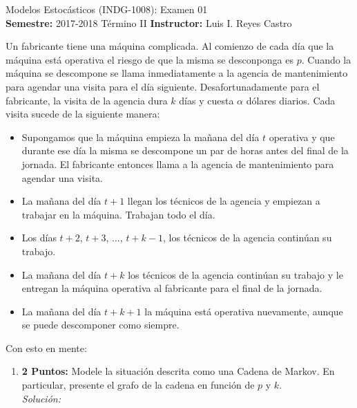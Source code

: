 \documentclass[ a4paper, twoside, 11pt]{article}
\newcommand{\numero}{01}
\begin{document}
\allowdisplaybreaks



\begin{center}
\Large Modelos Estoc\'asticos (INDG-1008): Examen \numero \\[2ex]
\small \textbf{Semestre:} 2017-2018 T\'ermino II \qquad
\textbf{Instructor:} Luis I. Reyes Castro
\end{center}
\fullskip

\begin{problem}
\label{prob:maquina-caprichosa}
Un fabricante tiene una m\'aquina complicada. Al comienzo de cada d\'ia que la m\'aquina est\'a operativa el riesgo de que la misma se desconponga es $p$. Cuando la m\'aquina se descompone se llama inmediatamente a la agencia de mantenimiento para agendar una visita para el d\'ia siguiente. Desafortunadamente para el fabricante, la visita de la agencia dura \linebreak $k$ d\'ias y cuesta $\alpha$ d\'olares diarios. Cada visita sucede de la siguiente manera: 
\begin{itemize}
\item Supongamos que la m\'aquina empieza la ma\~nana del d\'ia $t$ operativa y que durante ese d\'ia la misma se descompone un par de horas antes del final de la jornada. El fabricante entonces llama a la agencia de mantenimiento para agendar una visita. 
\item La ma\~nana del d\'ia $t+1$ llegan los t\'ecnicos de la agencia y empiezan a trabajar en la m\'aquina. Trabajan todo el d\'ia. 
\item Los d\'ias $t+2$, $t+3$, $\dots$, $t+k-1$, los t\'ecnicos de la agencia contin\'uan su trabajo. 
\item La ma\~nana del d\'ia $t+k$ los t\'ecnicos de la agencia contin\'uan su trabajo y le entregan la m\'aquina operativa al fabricante para el final de la jornada. 
\item La ma\~nana del d\'ia $t+k+1$ la m\'aquina est\'a operativa nuevamente, aunque se puede descomponer como siempre. 
\end{itemize}

Con esto en mente: 
\begin{enumerate}[label=\textbf{\alph*)}]
\item \textbf{2 Puntos:} Modele la situaci\'on descrita como una Cadena de Markov. En particular, presente el grafo de la cadena en funci\'on de $p$ y $k$. \\[1ex] \emph{Soluci\'on:}


\end{enumerate}
\end{problem}
\end{document}
